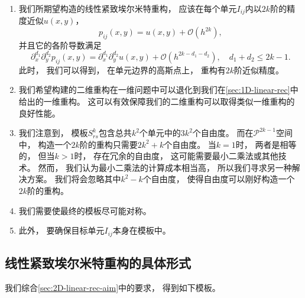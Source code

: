 \begin{enumerate}
  \item 我们所期望构造的线性紧致埃尔米特重构，
        应该在每个单元$I_{ij}$内以$2k$阶的精度近似$u(x,y)$，
        \begin{equation}
          p_{ij}(x,y) = u(x,y)+{\mathcal{O}}(h^{2k}),
        \end{equation}
        并且它的各阶导数满足
        \begin{equation}
          {\partial_{x}^{d_1}}{\partial_{y}^{d_2}}p_{ij}(x,y) = {\partial_{x}^{d_1}}{\partial_{y}^{d_2}}u(x,y)+{\mathcal{O}}(h^{2k-d_1-d_2}), \quad
          d_1+d_2 \le 2k-1.
        \end{equation}
        此时，
        我们可以得到，
        在单元边界的高斯点上，
        重构有$2k$阶近似精度。
  \item 我们希望构建的二维重构在一维问题中可以退化到我们在\cref{sec:1D-linear-rec}中给出的一维重构。
        这可以有效保障我们的二维重构可以取得类似一维重构的良好性能。
  \item 我们注意到，
        模板$S^k_{rs}$包含总共$k^2$个单元中的$3k^2$个自由度。
        而在$\mathcal{P}^{2k-1}$空间中，
        构造一个$2k$阶的重构只需要$2k^2+k$个自由度。
        当$k=1$时，
        两者是相等的，
        但当$k>1$时，
        存在冗余的自由度，
        这可能需要最小二乘法或其他技术。
        然而，
        我们认为最小二乘法的计算成本相当高，
        所以我们寻求另一种解决方案。
        我们将会忽略其中$k^2-k$个自由度，
        使得自由度可以刚好构造一个$2k$阶的重构。
  \item 我们需要使最终的模板尽可能对称。
  \item 此外，
        要确保目标单元$I_{ij}$本身在模板中。
\end{enumerate}

\subsection{线性紧致埃尔米特重构的具体形式}

我们综合\cref{sec:2D-linear-rec-aim}中的要求，
得到如下模板。

